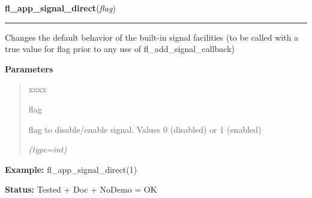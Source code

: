 \hspace{.8\funcindent}\begin{boxedminipage}{\funcwidth}

    \raggedright \textbf{fl\_app\_signal\_direct}(\textit{flag})

    \vspace{-1.5ex}

    \rule{\textwidth}{0.5\fboxrule}
\setlength{\parskip}{2ex}
    Changes the default behavior of the built-in signal facilities (to be 
    called with a true value for flag prior to any use of 
    fl\_add\_signal\_callback)

\setlength{\parskip}{1ex}
      \textbf{Parameters}
      \vspace{-1ex}

      \begin{quote}
        \begin{Ventry}{xxxx}

          \item[flag]

          flag to disable/enable signal. Values 0 (disabled) or 1 (enabled)

            {\it (type=int)}

        \end{Ventry}

      \end{quote}

\textbf{Example:} fl\_app\_signal\_direct(1)



\textbf{Status:} Tested + Doc + NoDemo = OK



    \end{boxedminipage}

    \label{xformslib:flbasic:fl_add_timeout}

    \vspace{0.5ex}

